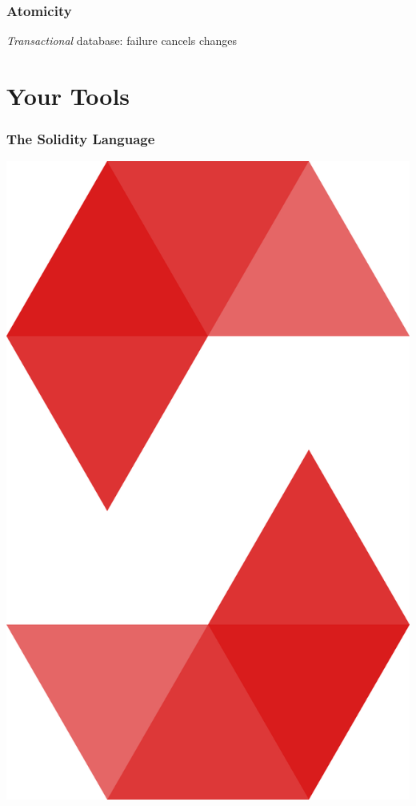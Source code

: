 \documentclass[aspectratio=169,17pt]{beamer}
\begin{document}
\begin{frame}
	\frametitle{Atomicity}
	\emph{Transactional} database: failure cancels changes

\end{frame}

\section{Your Tools}
\begin{frame}
	\frametitle{The Solidity Language}
	\centering
	\includegraphics[height=.5\textheight]{assets/solidity.png}
\end{frame}
\end{document}

